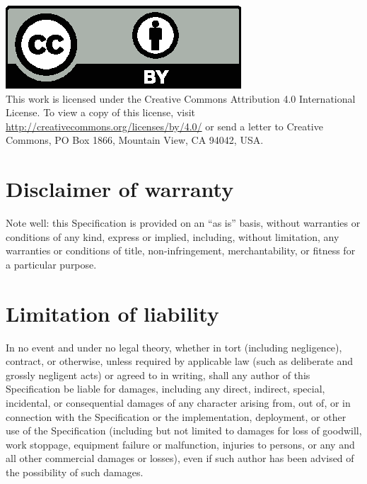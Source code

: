 \documentclass{uavcandoc}
\begin{document}
\begin{titlepage}
\hspace*{\fill}\includegraphics[height=2\baselineskip]{cc-by}\hspace*{\fill}\\
This work is licensed under the Creative Commons Attribution 4.0 International License.
To view a copy of this license, visit \url{http://creativecommons.org/licenses/by/4.0/}
or send a letter to Creative Commons, PO Box 1866, Mountain View, CA 94042, USA.

\section*{Disclaimer of warranty}

Note well: this Specification is provided on an ``as is'' basis, without warranties or conditions of any kind,
express or implied, including, without limitation, any warranties or conditions of
title, non-infringement, merchantability, or fitness for a particular purpose.

\section*{Limitation of liability}

In no event and under no legal theory, whether in tort (including negligence), contract, or otherwise,
unless required by applicable law (such as deliberate and grossly negligent acts) or agreed to in writing,
shall any author of this Specification be liable for damages,
including any direct, indirect, special, incidental, or consequential damages of any character arising
from, out of, or in connection with the Specification or the implementation, deployment,
or other use of the Specification (including but not limited to damages for loss of goodwill,
work stoppage, equipment failure or malfunction, injuries to persons,
or any and all other commercial damages or losses),
even if such author has been advised of the possibility of such damages.

\end{titlepage}

\tableofcontents
\clearpage\onecolumn\listoftables
\clearpage\onecolumn\listoffigures

\mainmatter








\end{document}
